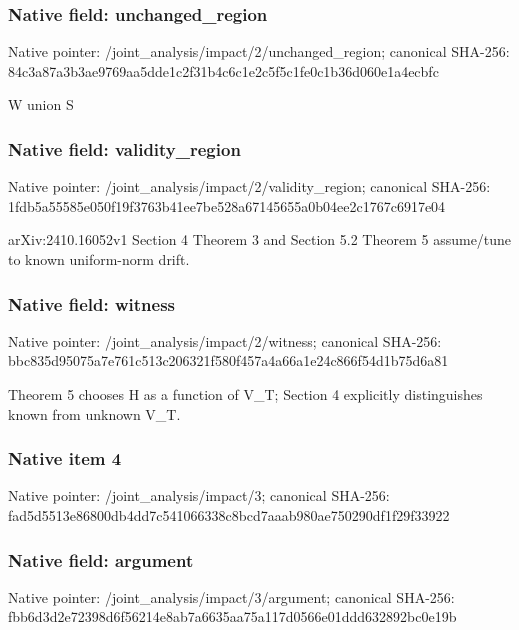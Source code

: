 \documentclass[10pt,a4paper]{article}
\begin{document}
\subsubsection{Native field: unchanged\_\allowbreak{}region}
Native pointer: /joint\_\allowbreak{}analysis/impact/2/unchanged\_\allowbreak{}region; canonical SHA-256: 84c3a87a3b3ae9769aa5dde1c2f31b4c6c1e2c5f5c1fe0c1b36d060e1a4ecbfc

\begingroup\raggedright\sloppy W union S\par\endgroup

\subsubsection{Native field: validity\_\allowbreak{}region}
Native pointer: /joint\_\allowbreak{}analysis/impact/2/validity\_\allowbreak{}region; canonical SHA-256: 1fdb5a55585e050f19f3763b41ee7be528a67145655a0b04ee2c1767c6917e04

\begingroup\raggedright\sloppy arXiv:\allowbreak{}2410.16052v1 Section 4 Theorem 3 and Section 5.2 Theorem 5 assume/\allowbreak{}tune to known uniform-norm drift.\par\endgroup

\subsubsection{Native field: witness}
Native pointer: /joint\_\allowbreak{}analysis/impact/2/witness; canonical SHA-256: bbc835d95075a7e761c513c206321f580f457a4a66a1e24c866f54d1b75d6a81

\begingroup\raggedright\sloppy Theorem 5 chooses H as a function of V\_\allowbreak{}T;\allowbreak{} Section 4 explicitly distinguishes known from unknown V\_\allowbreak{}T.\par\endgroup

\subsubsection{Native item 4}
Native pointer: /joint\_\allowbreak{}analysis/impact/3; canonical SHA-256: fad5d5513e86800db4dd7c541066338c8bcd7aaab980ae750290df1f29f33922

\subsubsection{Native field: argument}
Native pointer: /joint\_\allowbreak{}analysis/impact/3/argument; canonical SHA-256: fbb6d3d2e72398d6f56214e8ab7a6635aa75a117d0566e01ddd632892bc0e19b
\end{document}
